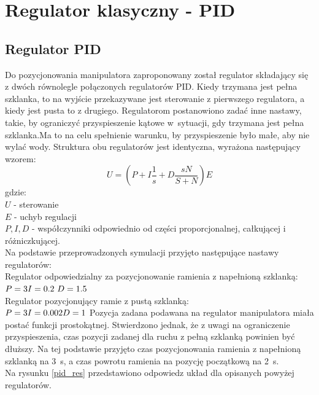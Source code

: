 \chapter{Regulator klasyczny - PID}
\label{cha:regulator}

\section{Regulator PID}
Do pozycjonowania manipulatora zaproponowany został regulator składający się z dwóch równolegle połączonych regulatorów PID. Kiedy trzymana jest pełna szklanka, to na wyjście przekazywane jest sterowanie z pierwszego regulatora, a kiedy jest pusta to z drugiego. Regulatorom postanowiono zadać inne nastawy, takie, by ograniczyć przyspieszenie kątowe w~sytuacji, gdy trzymana jest pełna szklanka.Ma to na celu spełnienie warunku, by przyspieszenie było małe, aby nie wylać wody. Struktura obu regulatorów jest identyczna, wyrażona następujący wzorem:
\begin{equation}\label{key}
U = (P + I \frac{1}{s} + D\frac{sN}{S+N}) E
\end{equation}
gdzie:\\
$
U$ - sterowanie\\
$E$ - uchyb regulacji\\
$P, I, D$ - współczynniki odpowiednio od części proporcjonalnej, całkującej i różniczkującej.\\
Na podstawie przeprowadzonych symulacji przyjęto następujące nastawy regulatorów:\\
Regulator odpowiedzialny za pozycjonowanie ramienia z napełnioną szklanką:\\
$
P = 3\\
I = 0.2\\\
D = 1.5\\
$\\
Regulator pozycjonujący ramie z pustą szklanką:\\
$
P = 3\\
I = 0.002\\
D = 1\\
$
Pozycja zadana podawana na regulator manipulatora miała postać funkcji prostokątnej. Stwierdzono jednak, że z uwagi na ograniczenie przyspieszenia, czas pozycji zadanej dla ruchu z pełną szklanką powinien być dłuższy. Na tej podstawie przyjęto czas pozycjonowania ramienia z napełnioną szklanką na 3~s, a czas powrotu ramienia na pozycję początkową na 2~s.\\
Na rysunku \ref{pid_res} przedstawiono odpowiedz układ dla opisanych powyżej regulatorów.
